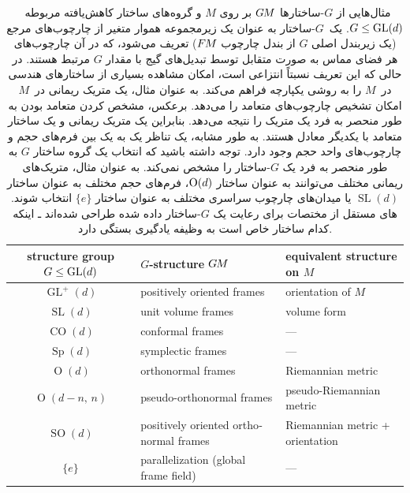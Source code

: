 \begin{table}
	\centering
	\renewcommand\arraystretch{1.1}
	\small
	\begin{latin}
		\begin{tabular}{cll}
			\toprule
			structure group $G\leq\operatorname{GL}(d)$ & $G$-structure $G\mkern-1.4muM$			& equivalent structure on $M$		\\[.25ex]
			\midrule
			$\operatorname{GL}^+(d)$	& positively oriented frames			& orientation of $M$			\\
			$\operatorname{SL}(d)$		& unit volume frames				& volume form				\\
			$\operatorname{CO}(d)$		& conformal frames				& ---					\\
			$\operatorname{Sp}(d)$		& symplectic frames				& ---					\\
			$\operatorname{O}(d)$		& orthonormal frames				& Riemannian metric			\\
			$\operatorname{O}(d-n,\,n)$	& pseudo-orthonormal frames			& pseudo-Riemannian metric		\\
			$\operatorname{SO}(d)$		& positively oriented orthonormal frames	& Riemannian metric + orientation	\\
			$\{e\}$				& parallelization (global frame field)	& ---					\\[.25ex]
			\bottomrule
		\end{tabular}
	\end{latin}
	\vspace*{2ex}
	\caption{
		مثال‌هایی از $G$-ساختارها $G\mkern-1.4muM$ بر روی $M$ و گروه‌های ساختار کاهش‌یافته مربوطه~$G\leq\operatorname{GL}(d)$.
		یک~$G$-ساختار به عنوان یک زیرمجموعه هموار متغیر از چارچوب‌های مرجع (یک زیربندل اصلی $G$ از بندل چارچوب $F\mkern-1.5muM$) تعریف می‌شود، که در آن چارچوب‌های هر فضای مماس به صورت متقابل توسط تبدیل‌های گیج با مقدار $G$ مرتبط هستند.
		در حالی که این تعریف نسبتاً انتزاعی است، امکان مشاهده بسیاری از ساختارهای هندسی در~$M$ را به روشی یکپارچه فراهم می‌کند.
		به عنوان مثال، یک متریک ریمانی در~$M$ امکان تشخیص چارچوب‌های متعامد را می‌دهد.
		برعکس، مشخص کردن متعامد بودن به طور منحصر به فرد یک متریک را نتیجه می‌دهد.
		بنابراین یک متریک ریمانی و یک ساختار متعامد با یکدیگر معادل هستند.
		به طور مشابه، یک تناظر یک به یک بین فرم‌های حجم و چارچوب‌های واحد حجم وجود دارد.
		توجه داشته باشید که انتخاب یک گروه ساختار $G$ به طور منحصر به فرد یک $G$-ساختار را مشخص نمی‌کند.
		به عنوان مثال، متریک‌های ریمانی مختلف می‌توانند به عنوان ساختار $\operatorname{O}(d)$، فرم‌های حجم مختلف به عنوان ساختار $\operatorname{SL}(d)$ یا میدان‌های چارچوب سراسری مختلف به عنوان ساختار $\{e\}$ انتخاب شوند.
		\CNN{}های مستقل از مختصات برای رعایت یک $G$-ساختار داده شده طراحی شده‌اند ـ اینکه کدام ساختار خاص است به وظیفه یادگیری بستگی دارد.
	}
	\label{tab:G_structures}
\end{table}


